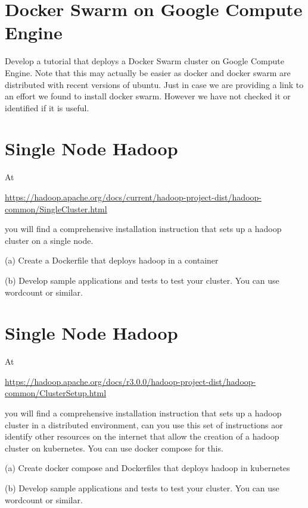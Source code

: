 \section{Docker Swarm on Google Compute Engine}

\begin{exercise}
  Develop a tutorial that deploys a Docker Swarm cluster on Google
  Compute Engine. Note that this may actually be easier as docker
  and docker swarm are distributed with recent versions of
  ubuntu. Just in case we are providing a link to an effort we found
  to install docker swarm. However we have not checked it or
  identified if it is useful.


\end{exercise}

\section{Single Node Hadoop}

\begin{exercise}

At

\url{https://hadoop.apache.org/docs/current/hadoop-project-dist/hadoop-common/SingleCluster.html}

you will find a comprehensive installation instruction that sets up a
hadoop cluster on a single node. 

(a) Create a Dockerfile that deploys hadoop in a container

(b) Develop sample applications and tests to test your cluster. You
can use wordcount or similar.

\end{exercise}


\section{Single Node Hadoop}

\begin{exercise}

At

\url{https://hadoop.apache.org/docs/r3.0.0/hadoop-project-dist/hadoop-common/ClusterSetup.html}

you will find a comprehensive installation instruction that sets up a
hadoop cluster in a distributed environment, can you use this set of
instructions aor identify other resources on the internet that allow
the creation of a hadoop cluster on kubernetes. You can use docker
compose for this.


(a) Create docker compose and Dockerfiles that deploys hadoop in
kubernetes

(b) Develop sample applications and tests to test your cluster. You
can use wordcount or similar.

\end{exercise}




